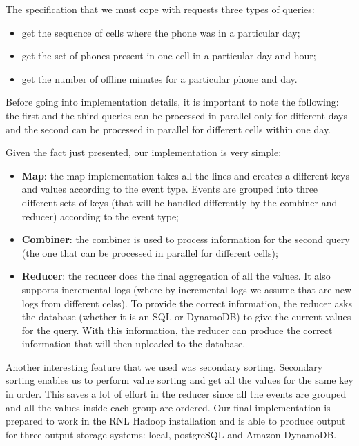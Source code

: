 \documentclass{article}
\begin{document}
The specification that we must cope with requests three types of queries: 

\begin{itemize}
\item get the sequence of cells where the phone was in a particular day;
\item get the set of phones present in one cell in a particular day and hour;
\item get the number of offline minutes for a particular phone and day.
\end{itemize}

Before going into implementation details, it is important to note the following: the first and the third queries can be processed in parallel only for different days and the second can be processed in parallel for different cells within one day.

Given the fact just presented, our implementation is very simple:

\begin{itemize}
\item \textbf{Map}: the map implementation takes all the lines and creates a different keys and values according to the event type. Events are grouped into three different sets of keys (that will be handled differently by the combiner and reducer) according to the event type;
\item \textbf{Combiner}: the combiner is used to process information for the second query (the one that can be processed in parallel for different cells);
\item \textbf{Reducer}: the reducer does the final aggregation of all the values. It also supports incremental logs (where by incremental logs we assume that are new logs from different celss). To provide the correct information, the reducer asks the database (whether it is an SQL or DynamoDB) to give the current values for the query. With this information, the reducer can produce the correct information that will then uploaded to the database. 
\end{itemize}

Another interesting feature that we used was secondary sorting. Secondary sorting enables us to perform value sorting and get all the values for the same key in order. This saves a lot of effort in the reducer since all the events are grouped and all the values inside each group are ordered.
Our final implementation is prepared to work in the RNL Hadoop installation and is able to produce output for three output storage systems: local, postgreSQL and Amazon DynamoDB. 
\end{document}
